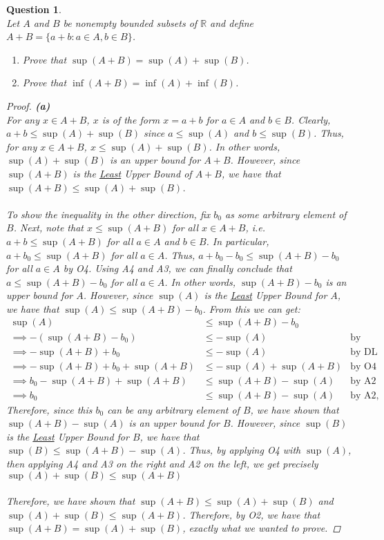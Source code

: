 \documentclass[10pt,a4paper]{article}
\newtheorem*{question*}{Question}
\theoremstyle{definition}
\begin{document}
\begin{question*}{$ $}
\\Let $A$ and $B$ be nonempty bounded subsets of $\mathbb{R}$ and define $A + B = \{a + b : a \in A, b \in B\}$.
\begin{enumerate}[label = (\alph*)]
\item Prove that $\sup(A + B) = \sup(A) + \sup(B)$.
\item Prove that $\inf(A + B) = \inf(A) + \inf(B)$.
\end{enumerate}

\begin{proof}{\textbf{(a)}}
\\For any $x \in A + B$, $x$ is of the form $x = a + b$ for $a \in A$ and $b \in B$. Clearly, $a + b \leq \sup(A) + \sup(B)$ since $a \leq \sup(A)$ and $b \leq \sup(B)$. Thus, for any $x \in A + B$, $x \leq \sup(A) + \sup(B)$. In other words, $\sup(A) + \sup(B)$ is an upper bound for $A+B$. However, since $\sup(A+B)$ is the \underline{Least} Upper Bound of $A + B$, we have that $\sup(A+B) \leq \sup(A) + \sup(B)$.
\\
\\To show the inequality in the other direction, fix $b_0$ as some arbitrary element of $B$. Next, note that $x \leq \sup(A + B)$ for all $x \in A + B$, i.e. $a + b \leq \sup(A + B)$ for all $a \in A$ and $b \in B$. In particular, $a + b_0 \leq \sup(A+B)$ for all $a \in A$. Thus, $a + b_0 - b_0 \leq \sup(A+B) - b_0$ for all $a \in A$ by O4. Using A4 and A3, we can finally conclude that $a \leq \sup(A + B) - b_0$ for all $a \in A$. In other words, $\sup(A + B) - b_0$ is an upper bound for $A$. However, since $\sup(A)$ is the \underline{Least} Upper Bound for $A$, we have that $\sup(A) \leq \sup(A+B) - b_0$. From this we can get:
\begin{align*}
\sup(A) &\leq \sup(A+B) - b_0\\
\implies -(\sup(A+B) - b_0) &\leq -\sup(A) &\text{by Theorem 3.2 (i)}\\
\implies -\sup(A+B) + b_0 &\leq -\sup(A) &\text{by DL}\\
\implies -\sup(A+B) + b_0 + \sup(A + B) &\leq -\sup(A) + \sup(A+B) &\text{by O4}\\
\implies b_0 -\sup(A+B) + \sup(A + B) &\leq \sup(A+B) - \sup(A) &\text{by A2}\\
\implies b_0 &\leq \sup(A+B) - \sup(A) &\text{by A2, A4, and A3 in that order}
\end{align*}
Therefore, since this $b_0$ can be any arbitrary element of $B$, we have shown that $\sup(A+B) - \sup(A)$ is an upper bound for $B$. However, since $\sup(B)$ is the \underline{Least} Upper Bound for $B$, we have that $\sup(B) \leq \sup(A + B) - \sup(A)$. Thus, by applying O4 with $\sup(A)$, then applying A4 and A3 on the right and A2 on the left, we get precisely $\sup(A) + \sup(B) \leq \sup(A + B)$
\\
\\Therefore, we have shown that $\sup(A+B) \leq \sup(A) + \sup(B)$ and $\sup(A) + \sup(B) \leq \sup(A+B)$. Therefore, by O2, we have that $\sup(A+B) = \sup(A) + \sup(B)$, exactly what we wanted to prove.
\end{proof}


\end{question*}
\end{document}
